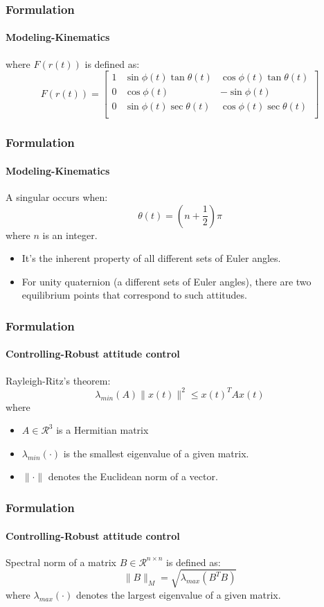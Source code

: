 \documentclass{beamer}
\begin{document}
\begin{frame}
\frametitle{Formulation}
\framesubtitle{Modeling-Kinematics}
where $F(r(t))$ is defined as:
\begin{equation}
F(r(t))=\begin{bmatrix}
1&\sin\phi(t)\tan\theta(t)&\cos\phi(t)\tan\theta(t)\\
0&\cos\phi(t)&-\sin\phi(t)\\
0&\sin\phi(t)\sec\theta(t)&\cos\phi(t)\sec\theta(t)\\
\end{bmatrix}
\end{equation}
\end{frame}

\begin{frame}
\frametitle{Formulation}
\framesubtitle{Modeling-Kinematics}
A singular occurs when:
$$\theta(t)=(n+\frac{1}{2})\pi$$
where $n$ is an integer. \\
\begin{itemize}
	\item It's the inherent property of all different sets of Euler angles. 
	\item For unity quaternion (a different sets of Euler angles), there are two equilibrium points that correspond to such attitudes. 
\end{itemize}
\end{frame}

\begin{frame}
\frametitle{Formulation}
\framesubtitle{Controlling-Robust attitude control}
Rayleigh-Ritz's theorem:
\begin{equation}\label{Rayleigh-Ritz's theorem}
\lambda_{min}(A)\lVert x(t)\rVert^{2}\leq x(t)^{T}Ax(t)
\end{equation}
where
\begin{itemize}
	\item $A\in \mathcal{R}^{3}$ is a Hermitian matrix
	\item $\lambda_{min}(\cdot)$ is the smallest eigenvalue of a given matrix. 
	\item $\lVert \cdot \rVert$ denotes the Euclidean norm of a vector.
\end{itemize} 
\end{frame}

\begin{frame}
\frametitle{Formulation}
\framesubtitle{Controlling-Robust attitude control}
Spectral norm of a matrix $B\in \mathcal{R}^{n\times n}$ is defined as:
\begin{equation}
\lVert B\rVert_{M}=\sqrt{\lambda_{max}(B^{T}B)}
\end{equation}
where $\lambda_{max}(\cdot)$ denotes the largest eigenvalue of a given matrix. 
\end{frame}
\end{document}
